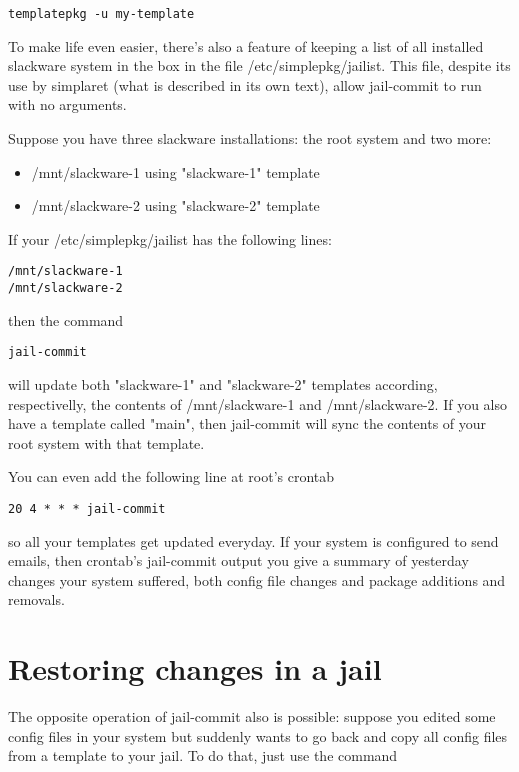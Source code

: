 \documentclass{article}
\begin{document}
\begin{verbatim}
templatepkg -u my-template
\end{verbatim}

To make life even easier, there's also a feature of keeping a list of all installed slackware system in the box in the file /etc/simplepkg/jailist. This file, despite its use by simplaret (what is described in its own text), allow jail-commit to run with no arguments.

Suppose you have three slackware installations: the root system and two more:

\begin{itemize}
  \item /mnt/slackware-1 using "slackware-1" template
  \item /mnt/slackware-2 using "slackware-2" template 
\end{itemize}

If your /etc/simplepkg/jailist has the following lines:

\begin{verbatim}
/mnt/slackware-1
/mnt/slackware-2
\end{verbatim}

then the command

\begin{verbatim}
jail-commit
\end{verbatim}

will update both "slackware-1" and "slackware-2" templates according, respectivelly, the contents of /mnt/slackware-1 and /mnt/slackware-2. If you also have a template called "main", then jail-commit will sync the contents of your root system with that template.

You can even add the following line at root's crontab

\begin{verbatim}
20 4 * * * jail-commit
\end{verbatim}

so all your templates get updated everyday. If your system is configured to send emails, then crontab's jail-commit output you give a summary of yesterday changes your system suffered, both config file changes and package additions and removals.

\section{Restoring changes in a jail}

The opposite operation of jail-commit also is possible: suppose you edited some config files in your system but suddenly wants to go back and copy all config files from a template to your jail. To do that, just use the command
\end{document}
